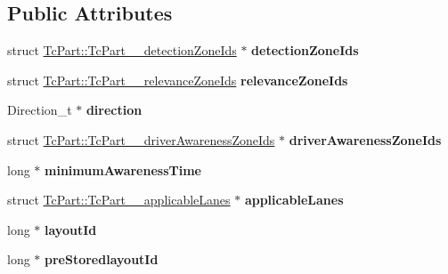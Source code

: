 \subsection*{Public Attributes}
\begin{DoxyCompactItemize}
\item 
struct \hyperlink{structTcPart_1_1TcPart____detectionZoneIds}{Tc\+Part\+::\+Tc\+Part\+\_\+\+\_\+detection\+Zone\+Ids} $\ast$ {\bfseries detection\+Zone\+Ids}\hypertarget{structTcPart_ac4886914ae083cd8fbc84b272b32ae39}{}\label{structTcPart_ac4886914ae083cd8fbc84b272b32ae39}

\item 
struct \hyperlink{structTcPart_1_1TcPart____relevanceZoneIds}{Tc\+Part\+::\+Tc\+Part\+\_\+\+\_\+relevance\+Zone\+Ids} {\bfseries relevance\+Zone\+Ids}\hypertarget{structTcPart_a5a02aaec2e48f3528adb4eb7a04457e9}{}\label{structTcPart_a5a02aaec2e48f3528adb4eb7a04457e9}

\item 
Direction\+\_\+t $\ast$ {\bfseries direction}\hypertarget{structTcPart_abf01d168b9c807758961dc227da89f13}{}\label{structTcPart_abf01d168b9c807758961dc227da89f13}

\item 
struct \hyperlink{structTcPart_1_1TcPart____driverAwarenessZoneIds}{Tc\+Part\+::\+Tc\+Part\+\_\+\+\_\+driver\+Awareness\+Zone\+Ids} $\ast$ {\bfseries driver\+Awareness\+Zone\+Ids}\hypertarget{structTcPart_af2bdfdb43a341dfa920fb1c9a9bfd6c0}{}\label{structTcPart_af2bdfdb43a341dfa920fb1c9a9bfd6c0}

\item 
long $\ast$ {\bfseries minimum\+Awareness\+Time}\hypertarget{structTcPart_a4346351f249ce266ac61413beabe71cc}{}\label{structTcPart_a4346351f249ce266ac61413beabe71cc}

\item 
struct \hyperlink{structTcPart_1_1TcPart____applicableLanes}{Tc\+Part\+::\+Tc\+Part\+\_\+\+\_\+applicable\+Lanes} $\ast$ {\bfseries applicable\+Lanes}\hypertarget{structTcPart_a13b0f70c4a755f9d4bab869fc5203bfa}{}\label{structTcPart_a13b0f70c4a755f9d4bab869fc5203bfa}

\item 
long $\ast$ {\bfseries layout\+Id}\hypertarget{structTcPart_a6b3bfd0151a5a21b1df9ea0f4a3cddb7}{}\label{structTcPart_a6b3bfd0151a5a21b1df9ea0f4a3cddb7}

\item 
long $\ast$ {\bfseries pre\+Storedlayout\+Id}\hypertarget{structTcPart_aa1477da12a6c5dddb91919675b7d596e}{}\label{structTcPart_aa1477da12a6c5dddb91919675b7d596e}


\end{DoxyCompactItemize}
